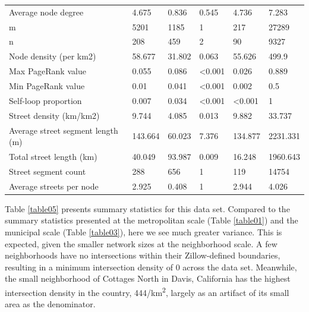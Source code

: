 \documentclass{article}
\begin{document}
\begin{table}
\begin{tabular}{llllll}
	Average node degree                         & 4.675   & 0.836   & 0.545          & 4.736          & 7.283    \\
	m                                           & 5201    & 1185    & 1              & 217            & 27289    \\
	n                                           & 208     & 459     & 2              & 90             & 9327     \\
	Node density (per km2)                      & 58.677  & 31.802  & 0.063          & 55.626         & 499.9    \\
	Max PageRank value                          & 0.055   & 0.086   & \textless0.001 & 0.026          & 0.889    \\
	Min PageRank value                          & 0.01    & 0.041   & \textless0.001 & 0.002          & 0.5      \\
	Self-loop proportion                        & 0.007   & 0.034   & \textless0.001 & \textless0.001 & 1        \\
	Street density (km/km2)                     & 9.744   & 4.085   & 0.013          & 9.882          & 33.737   \\
	Average street segment length (m)           & 143.664 & 60.023  & 7.376          & 134.877        & 2231.331 \\
	Total street length (km)                    & 40.049  & 93.987  & 0.009          & 16.248         & 1960.643 \\
	Street segment count                        & 288     & 656     & 1              & 119            & 14754    \\
	Average streets per node                    & 2.925   & 0.408   & 1              & 2.944          & 4.026    \\
	\bottomrule
\end{tabular}
\end{table}

Table \ref{table05} presents summary statistics for this data set. Compared to the summary statistics presented at the metropolitan scale (Table \ref{table01}) and the municipal scale (Table \ref{table03}), here we see much greater variance. This is expected, given the smaller network sizes at the neighborhood scale. A few neighborhoods have no intersections within their Zillow-defined boundaries, resulting in a minimum intersection density of 0 across the data set. Meanwhile, the small neighborhood of Cottages North in Davis, California has the highest intersection density in the country, 444/km\textsuperscript{2}, largely as an artifact of its small area as the denominator. 
\end{document}
